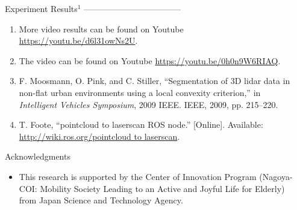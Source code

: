 \documentclass[final,hyperref={pdfpagelabels=false}]{beamer}
\begin{document}
\begin{frame}[t]
\begin{columns}[t]
\begin{column}{.48\textwidth}
\begin{block}{Experiment Results$^1$}
{\footnotesize\noindent-----------------------------------}\\
\begin{enumerate}
	\footnotesize
	\item More video results can be found on Youtube \url{https://youtu.be/d6l31owNs2U}.
	\item The video can be found on Youtube \url{https://youtu.be/0h0n9W6RIAQ}.
	\item F. Moosmann, O. Pink, and C. Stiller, “Segmentation of 3D lidar data in non-flat urban environments using a local convexity criterion,” in \textit{Intelligent Vehicles Symposium}, 2009 IEEE. IEEE, 2009, pp. 215–220.
	\item T. Foote, “pointcloud to laserscan ROS node.” [Online]. Available: \url{http://wiki.ros.org/pointcloud to laserscan}.
\end{enumerate}
\end{block}


\begin{block}{Acknowledgments}

\begin{itemize}
\item This research is supported by the Center of Innovation Program (Nagoya-COI: Mobility Society Leading to an Active and Joyful Life for Elderly) from Japan Science and Technology Agency.
\end{itemize}

\end{block}


\end{column} %

\begin{column}{.015\textwidth}\end{column} %

\end{columns} %

\end{frame} %
\end{document}
